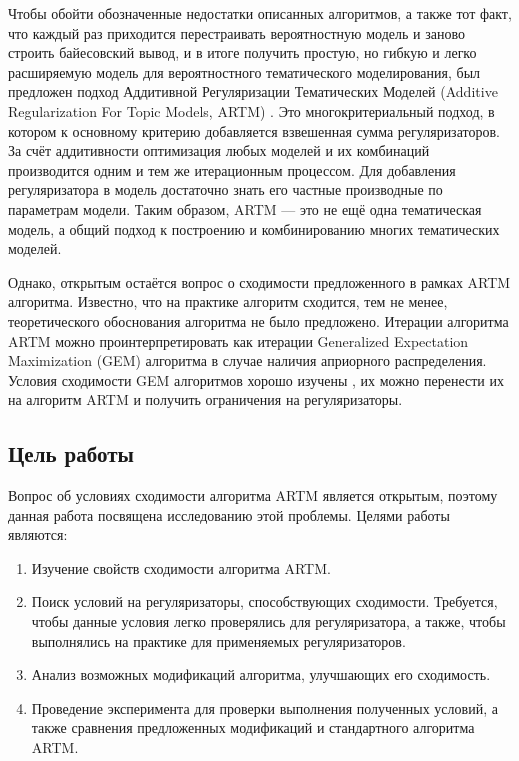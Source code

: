 \documentclass[12pt]{article}
\begin{document}
Чтобы обойти обозначенные недостатки описанных алгоритмов, а также тот факт, что каждый раз приходится перестраивать вероятностную модель и заново строить байесовский вывод, и в итоге получить простую, но гибкую и легко расширяемую модель для вероятностного тематического моделирования, был предложен подход Аддитивной Регуляризации Тематических Моделей (Additive Regularization For Topic Models, ARTM) \cite{vorontsov2014additive, vorontsov2014tutorial, vorontsov2015additive}. Это многокритериальный подход, в котором к основному критерию добавляется взвешенная сумма регуляризаторов.  За счёт аддитивности оптимизация любых моделей и их комбинаций производится одним и тем же итерационным процессом. Для добавления регуляризатора в модель достаточно знать его частные производные по параметрам модели. Таким образом, ARTM ---  это не ещё одна тематическая модель, а общий подход к построению и комбинированию многих тематических моделей. 

Однако, открытым остаётся вопрос о сходимости предложенного в рамках ARTM алгоритма. Известно, что на практике алгоритм сходится, тем не менее, теоретического обоснования алгоритма не было предложено. Итерации алгоритма ARTM можно проинтерпретировать как итерации Generalized Expectation Maximization (GEM) алгоритма \cite{dempster1977maximum} в случае наличия априорного распределения. Условия сходимости GEM алгоритмов хорошо изучены \cite{wu1983convergence}, их можно перенести их на алгоритм ARTM и получить ограничения на регуляризаторы.

\subsection{Цель работы}
	
Вопрос об условиях сходимости алгоритма ARTM является открытым, поэтому данная работа посвящена исследованию этой проблемы. Целями работы являются:
\begin{enumerate}
\item Изучение свойств сходимости алгоритма ARTM. 
\item Поиск условий на регуляризаторы, способствующих сходимости. Требуется, чтобы данные условия легко проверялись для регуляризатора, а также, чтобы выполнялись на практике для применяемых регуляризаторов.
\item Анализ возможных модификаций алгоритма, улучшающих его сходимость.
\item Проведение эксперимента для проверки выполнения полученных условий, а также сравнения предложенных модификаций и стандартного алгоритма ARTM.
\end{enumerate}
\end{document}
